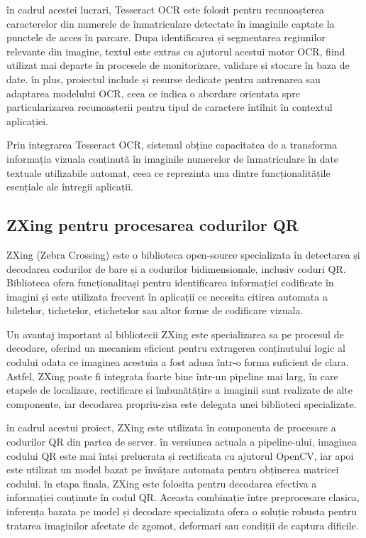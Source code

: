 în cadrul acestei lucrari, Tesseract OCR este folosit pentru recunoașterea caracterelor din numerele de înmatriculare detectate în imaginile captate la punctele de acces în parcare. Dupa identificarea și segmentarea regiunilor relevante din imagine, textul este extras cu ajutorul acestui motor OCR, fiind utilizat mai departe în procesele de monitorizare, validare și stocare în baza de date. în plus, proiectul include și resurse dedicate pentru antrenarea sau adaptarea modelului OCR, ceea ce indica o abordare orientata spre particularizarea recunoașterii pentru tipul de caractere întîlnit în contextul aplicației.

Prin integrarea Tesseract OCR, sistemul obține capacitatea de a transforma informația vizuala conținută în imaginile numerelor de înmatriculare în date textuale utilizabile automat, ceea ce reprezinta una dintre funcționalitățile esențiale ale întregii aplicații.

\subsection*{ZXing pentru procesarea codurilor QR}

ZXing (Zebra Crossing) este o biblioteca open-source specializata în detectarea și decodarea codurilor de bare și a codurilor bidimensionale, inclusiv coduri QR. Biblioteca ofera funcționalitași pentru identificarea informației codificate în imagini și este utilizata frecvent în aplicații ce necesita citirea automata a biletelor, tichetelor, etichetelor sau altor forme de codificare vizuala.

Un avantaj important al bibliotecii ZXing este specializarea sa pe procesul de decodare, oferind un mecanism eficient pentru extragerea conținutului logic al codului odata ce imaginea acestuia a fost adusa într-o forma suficient de clara. Astfel, ZXing poate fi integrata foarte bine într-un pipeline mai larg, în care etapele de localizare, rectificare și îmbunătățire a imaginii sunt realizate de alte componente, iar decodarea propriu-zisa este delegata unei biblioteci specializate.

în cadrul acestui proiect, ZXing este utilizata în componenta de procesare a codurilor QR din partea de server. în versiunea actuala a pipeline-ului, imaginea codului QR este mai întși prelucrata și rectificata cu ajutorul OpenCV, iar apoi este utilizat un model bazat pe învățare automata pentru obținerea matricei codului. în etapa finala, ZXing este folosita pentru decodarea efectiva a informației conținute în codul QR. Aceasta combinație între preprocesare clasica, inferența bazata pe model și decodare specializata ofera o soluție robusta pentru tratarea imaginilor afectate de zgomot, deformari sau condiții de captura dificile.

